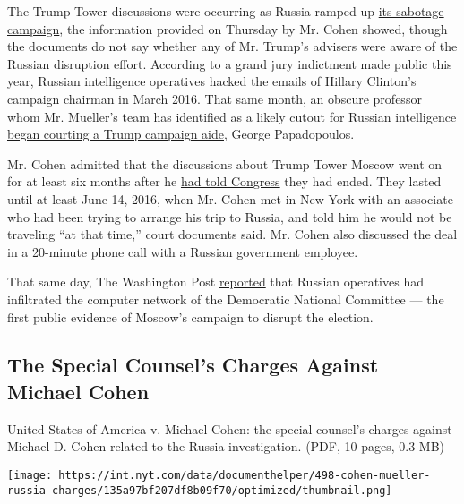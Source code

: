 The Trump Tower discussions were occurring as Russia ramped up
\href{https://www.nytimes.com/2016/12/13/us/politics/russia-hack-election-dnc.html}{its
sabotage campaign}, the information provided on Thursday by Mr. Cohen
showed, though the documents do not say whether any of Mr. Trump's
advisers were aware of the Russian disruption effort. According to a
grand jury indictment made public this year, Russian intelligence
operatives hacked the emails of Hillary Clinton's campaign chairman in
March 2016. That same month, an obscure professor whom Mr. Mueller's
team has identified as a likely cutout for Russian intelligence
\href{https://www.nytimes.com/2017/12/30/us/politics/how-fbi-russia-investigation-began-george-papadopoulos.html}{began
courting a Trump campaign aide}, George Papadopoulos.

Mr. Cohen admitted that the discussions about Trump Tower Moscow went on
for at least six months after he
\href{https://www.nytimes.com/2017/08/30/us/politics/trump-russia-michael-cohen.html}{had
told Congress} they had ended. They lasted until at least June 14, 2016,
when Mr. Cohen met in New York with an associate who had been trying to
arrange his trip to Russia, and told him he would not be traveling ``at
that time,'' court documents said. Mr. Cohen also discussed the deal in
a 20-minute phone call with a Russian government employee.

That same day, The Washington Post
\href{https://www.washingtonpost.com/world/national-security/russian-government-hackers-penetrated-dnc-stole-opposition-research-on-trump/2016/06/14/cf006cb4-316e-11e6-8ff7-7b6c1998b7a0_story.html?utm_term=.bc6441d4b944}{reported}
that Russian operatives had infiltrated the computer network of the
Democratic National Committee --- the first public evidence of Moscow's
campaign to disrupt the election.

\hypertarget{the-special-counsels-charges-against-michael-cohen}{%
\subsection{The Special Counsel's Charges Against Michael
Cohen}\label{the-special-counsels-charges-against-michael-cohen}}

United States of America v. Michael Cohen: the special counsel's charges
against Michael D. Cohen related to the Russia investigation. (PDF, 10
pages, 0.3 MB)

\texttt{[image: https://int.nyt.com/data/documenthelper/498-cohen-mueller-russia-charges/135a97bf207df8b09f70/optimized/thumbnail.png]}

